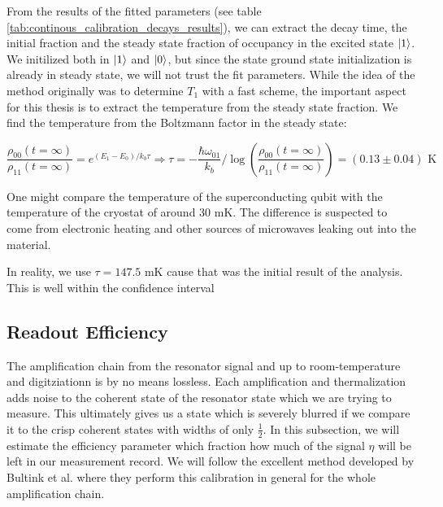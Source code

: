 From the results of the fitted parameters (see table \ref{tab:continous_calibration_decays_results}), we can extract the decay time, the initial fraction and the steady state fraction of occupancy in the excited state $\ket{1}$. We initilized both in $\ket{1}$ and $\ket{0}$, but since the state ground state initialization is already in steady state, we will not trust the fit parameters. While the idea of the method originally was to determine $T_1$ with a fast scheme, the important aspect for this thesis is to extract the temperature from the steady state fraction. We find the temperature from the Boltzmann factor in the steady state:
\begin{fullwidth}
\begin{equation}
    \frac{\rho_{00}(t=\infty)}{\rho_{11}(t=\infty)} = e^{(E_1 - E_0) / k_b \tau} \Rightarrow \tau = - \frac{\hbar \omega_{01}}{k_b} / \log\left(\frac{\rho_{00}(t=\infty)}{\rho_{11}(t=\infty)}\right)  =  (0.13 \pm 0.04) \text{ K}
\end{equation}
\end{fullwidth}
One might compare the temperature of the superconducting qubit with the temperature of the cryostat of around 30 mK. The difference is suspected to come from electronic heating and other sources of microwaves leaking out into the material. 

In reality, we use $\tau =  147.5 \text{ mK}$ cause that was the initial result of the analysis. This is well within the confidence interval


\subsection{Readout Efficiency}\label{sec:readout_efficiency}
The amplification chain from the resonator signal and up to room-temperature and digitziationn is by no means lossless. Each amplification and thermalization adds noise to the coherent state of the resonator state which we are trying to measure. This ultimately gives us a state which is severely blurred if we compare it to the crisp coherent states with widths of only $\frac12$. In this subsection, we will estimate the efficiency parameter which fraction how much of the signal $\eta$ will be left in our measurement record. We will follow the excellent method developed by Bultink et al. \cite{bultink_general_2018} where they perform this calibration in general for the whole amplification chain.

